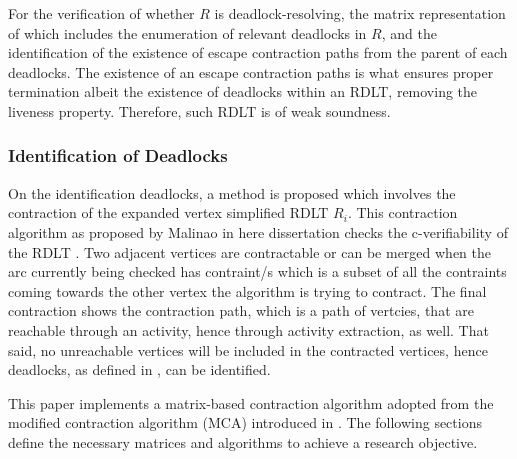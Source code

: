 For the verification of whether $R$ is deadlock-resolving, the matrix representation of which includes the enumeration of relevant deadlocks in $R$, and the identification of the existence of escape contraction paths from the parent of each deadlocks. The existence of an escape contraction paths is what ensures proper termination albeit the existence of deadlocks within an RDLT, removing the liveness property. Therefore, such RDLT is of weak soundness.

\subsubsection*{Identification of Deadlocks}
On the identification deadlocks, a method is proposed which involves the contraction \cite{Malinao2017} of the expanded vertex simplified RDLT $R_i$. This contraction algorithm as proposed by Malinao in here dissertation checks the c-verifiability of the RDLT \cite{Malinao2017}. Two adjacent vertices are contractable or can be merged when the arc currently being checked has contraint/s which is a subset of all the contraints coming towards the other vertex the algorithm is trying to contract. The final contraction shows the contraction path, which is a path of vertcies, that are reachable through an activity, hence through activity extraction, as well. That said, no unreachable vertices will be included in the contracted vertices, hence deadlocks, as defined in \cite{Ramirez2024}, can be identified.

This paper implements a matrix-based contraction algorithm adopted from the modified contraction algorithm (MCA) introduced in \cite{malinao2024model}. The following sections define the necessary matrices and algorithms to achieve a research objective. 


